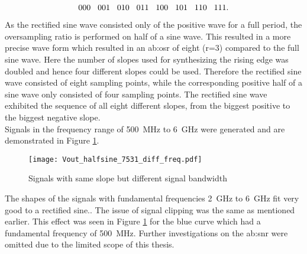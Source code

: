 \begin{equation}
 000\hspace{.3cm} 001\hspace{.3cm} 010\hspace{.3cm} 011\hspace{.3cm} 100\hspace{.3cm} 101\hspace{.3cm} 110\hspace{.3cm} 111.
\label{eq:RiemannCodeRectSine}
\end{equation}

As the rectified sine wave consisted only of the positive wave for a full period, the oversampling ratio is performed on half of a sine wave.
This resulted in a more precise wave form which resulted in an \gls{ab:osr} of eight (r=3) compared to the full sine wave.
Here the number of slopes used for synthesizing the rising edge was doubled and hence four different slopes could be used.
Therefore the rectified sine wave consisted of eight sampling points, while the corresponding positive half of a sine wave only consisted of four sampling points.
The rectified sine wave exhibited the sequence of all eight different slopes, from the biggest positive to the biggest negative slope.\\
Signals in the frequency range of \SI{500}{\mega \hertz} to \SI{6}{\giga \hertz} were generated and  are demonstrated in Figure \ref{fig:DiffSigBWSameSlope}.

\begin{figure}[htb!]
	\centering
  \texttt{[image: Vout\_halfsine\_7531\_diff\_freq.pdf]}
	\caption{Signals with same slope but different signal bandwidth}
	\label{fig:DiffSigBWSameSlope}
\end{figure}

The shapes of the signals with fundamental frequencies \SI{2}{\giga \hertz} to \SI{6}{\giga \hertz} fit very good to a rectified sine..
The issue of signal clipping was the same as mentioned earlier.
This effect was seen in Figure \ref{fig:DiffSigBWSameSlope} for the blue curve which had a fundamental frequency of \SI{500}{\mega \hertz}.
Further investigations on the \gls{ab:snr} were omitted due to the limited scope of this thesis.

